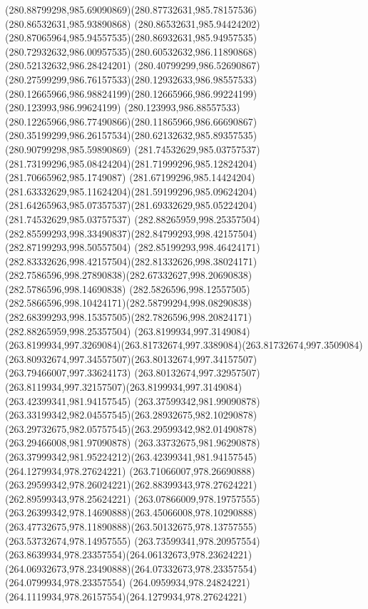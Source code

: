 {{  \curveto(280.88799298,985.69090869)(280.87732631,985.78157536)(280.86532631,985.93890868)
  \curveto(280.86532631,985.94424202)(280.87065964,985.94557535)(280.86932631,985.94957535)
  \curveto(280.72932632,986.00957535)(280.60532632,986.11890868)(280.52132632,986.28424201)
  \curveto(280.40799299,986.52690867)(280.27599299,986.76157533)(280.12932633,986.98557533)
  \curveto(280.12665966,986.98824199)(280.12665966,986.99224199)(280.123993,986.99624199)
  \curveto(280.123993,986.88557533)(280.12265966,986.77490866)(280.11865966,986.66690867)
  \curveto(280.35199299,986.26157534)(280.62132632,985.89357535)(280.90799298,985.59890869)
  \moveto(281.74532629,985.03757537)
  \curveto(281.73199296,985.08424204)(281.71999296,985.12824204)(281.70665962,985.1749087)
  \curveto(281.67199296,985.14424204)(281.63332629,985.11624204)(281.59199296,985.09624204)
  \curveto(281.64265963,985.07357537)(281.69332629,985.05224204)(281.74532629,985.03757537)
  \moveto(282.88265959,998.25357504)
  \curveto(282.85599293,998.33490837)(282.84799293,998.42157504)(282.87199293,998.50557504)
  \curveto(282.85199293,998.46424171)(282.83332626,998.42157504)(282.81332626,998.38024171)
  \curveto(282.7586596,998.27890838)(282.67332627,998.20690838)(282.5786596,998.14690838)
  \curveto(282.5826596,998.12557505)(282.5866596,998.10424171)(282.58799294,998.08290838)
  \curveto(282.68399293,998.15357505)(282.7826596,998.20824171)(282.88265959,998.25357504)
  \moveto(263.8199934,997.3149084)
  \curveto(263.8199934,997.3269084)(263.81732674,997.3389084)(263.81732674,997.3509084)
  \curveto(263.80932674,997.34557507)(263.80132674,997.34157507)(263.79466007,997.33624173)
  \curveto(263.80132674,997.32957507)(263.8119934,997.32157507)(263.8199934,997.3149084)
  \moveto(263.42399341,981.94157545)
  \curveto(263.37599342,981.99090878)(263.33199342,982.04557545)(263.28932675,982.10290878)
  \curveto(263.29732675,982.05757545)(263.29599342,982.01490878)(263.29466008,981.97090878)
  \curveto(263.33732675,981.96290878)(263.37999342,981.95224212)(263.42399341,981.94157545)
  \moveto(264.1279934,978.27624221)
  \curveto(263.71066007,978.26690888)(263.29599342,978.26024221)(262.88399343,978.27624221)
  \lineto(262.89599343,978.25624221)
  \curveto(263.07866009,978.19757555)(263.26399342,978.14690888)(263.45066008,978.10290888)
  \curveto(263.47732675,978.11890888)(263.50132675,978.13757555)(263.53732674,978.14957555)
  \curveto(263.73599341,978.20957554)(263.8639934,978.23357554)(264.06132673,978.23624221)
  \curveto(264.06932673,978.23490888)(264.07332673,978.23357554)(264.0799934,978.23357554)
  \curveto(264.0959934,978.24824221)(264.1119934,978.26157554)(264.1279934,978.27624221)
}}
